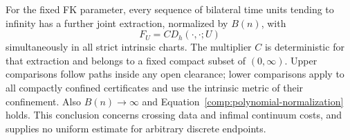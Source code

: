 \begin{corollary}
\label{comp:bilateral-comparison}
For the fixed FK parameter, every sequence of bilateral time units
tending to infinity has a further
joint extraction, normalized by $B(n)$, with
\[
 F_U=C D_h(\cdot,\cdot;U)
\]
simultaneously in all strict intrinsic charts.  The multiplier $C$
is deterministic for that extraction and belongs to a fixed compact
subset of $(0,\infty)$.  Upper comparisons follow paths inside any
open clearance; lower comparisons apply to all compactly confined
certificates and use the intrinsic metric of their confinement.
Also $B(n)\to\infty$ and
Equation~\eqref{comp:polynomial-normalization} holds.  This conclusion
concerns crossing data and infimal continuum costs, and supplies no
uniform estimate for arbitrary discrete endpoints.
\end{corollary}

